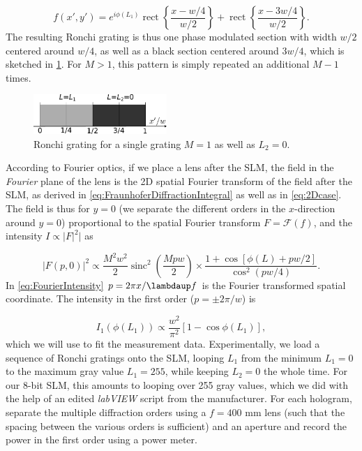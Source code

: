 \begin{equation}
    f(x',y') = e^{i\phi(L_1)} \operatorname{rect} \left\{ 
    \frac{x-w/4}{w/2}\right\} +
    \operatorname{rect}\left\{ \frac{x-3w/4}{w/2}\right\}.
\end{equation}
The resulting Ronchi grating is thus one phase modulated section with width $w/2$ centered around $w/4$, as well as a black section centered around $3w/4$, which is sketched in \cref{fig:OneGrating}. For $M>1$, this pattern is simply repeated an additional $M-1$ times.

\begin{figure}[h]
    \centering
    \includegraphics[width=0.45\textwidth]{figures/OneGrating.pdf}
    \caption{Ronchi grating for a single grating $M=1$ as well as $L_2=0$.}
    \label{fig:OneGrating}
\end{figure}

\noindent According to Fourier optics, if we place a lens after the SLM, the field in the \textit{Fourier} plane of the lens is the 2D spatial Fourier transform of the field after the SLM, as derived in \cref{eq:FraunhoferDiffractionIntegral} as well as in \cref{eq:2Dcase}.
The field is thus for $y=0$ (we separate the different orders in the $x$-direction around $y=0$) proportional to the spatial Fourier transform $F = \mathcal{F}(f)$, and the intensity $I\propto |F|^2|$ as \cite{Zhang1994}

\begin{equation}\label{eq:FourierIntensity}
    |F(p,0)|^2\propto
    \frac{M^2 w^2}{2}\operatorname{sinc}^2\left(\frac{M p w}{2}\right) \times
    \frac{1 + \cos{\left[\phi(L)+p w/2\right]}}{\cos^2(p w/4)}.
\end{equation}
In \cref{eq:FourierIntensity} $p=2\pi x/\lambdaup f$ is the Fourier transformed spatial coordinate. The intensity in the first order ($p=\pm 2\pi/w$) is

\begin{equation}\label{eq:IntensityFirstOrder}
    I_1(\phi(L_1)) \propto
    \frac{w^2}{\pi^2} \left[ 
    1-\cos{\phi(L_1)}
    \right],
\end{equation}
which we will use to fit the measurement data. Experimentally, we load a sequence of Ronchi gratings onto the SLM, looping $L_1$ from the minimum $L_1=0$ to the maximum gray value $L_1=255$, while keeping $L_2 =0$ the whole time.
For our 8-bit SLM, this amounts to looping over 255 gray values, which we did with the help of an edited \textit{labVIEW} script from the manufacturer.
For each hologram, separate the multiple diffraction orders using a $f=400$ mm lens (such that the spacing between the various orders is sufficient) and an aperture and record the power in the first order using a power meter.

